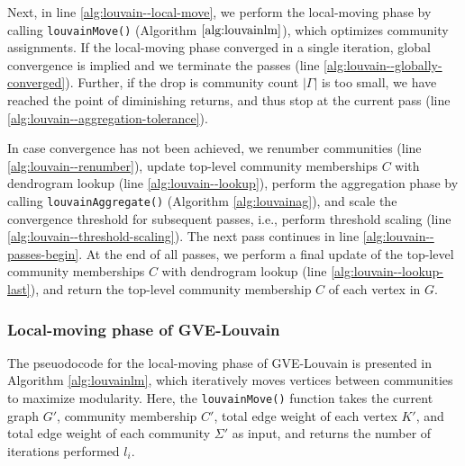 Next, in line \ref{alg:louvain--local-move}, we perform the local-moving phase by calling \texttt{louvainMove()} (Algorithm $\ref{alg:louvainlm}$), which optimizes community assignments. If the local-moving phase converged in a single iteration, global convergence is implied and we terminate the passes (line \ref{alg:louvain--globally-converged}). Further, if the drop is community count $|\Gamma|$ is too small, we have reached the point of diminishing returns, and thus stop at the current pass (line \ref{alg:louvain--aggregation-tolerance}).

In case convergence has not been achieved, we renumber communities (line \ref{alg:louvain--renumber}), update top-level community memberships $C$ with dendrogram lookup (line \ref{alg:louvain--lookup}), perform the aggregation phase by calling \texttt{louvainAggregate()} (Algorithm \ref{alg:louvainag}), and scale the convergence threshold for subsequent passes, i.e., perform threshold scaling (line \ref{alg:louvain--threshold-scaling}). The next pass continues in line \ref{alg:louvain--passes-begin}. At the end of all passes, we perform a final update of the top-level community memberships $C$ with dendrogram lookup (line \ref{alg:louvain--lookup-last}), and return the top-level community membership $C$ of each vertex in $G$.






\subsubsection{Local-moving phase of GVE-Louvain}

The pseuodocode for the local-moving phase of GVE-Louvain is presented in Algorithm \ref{alg:louvainlm}, which iteratively moves vertices between communities to maximize modularity. Here, the \texttt{louvainMove()} function takes the current graph $G'$, community membership $C'$, total edge weight of each vertex $K'$, and total edge weight of each community $\Sigma'$ as input, and returns the number of iterations performed $l_i$.

